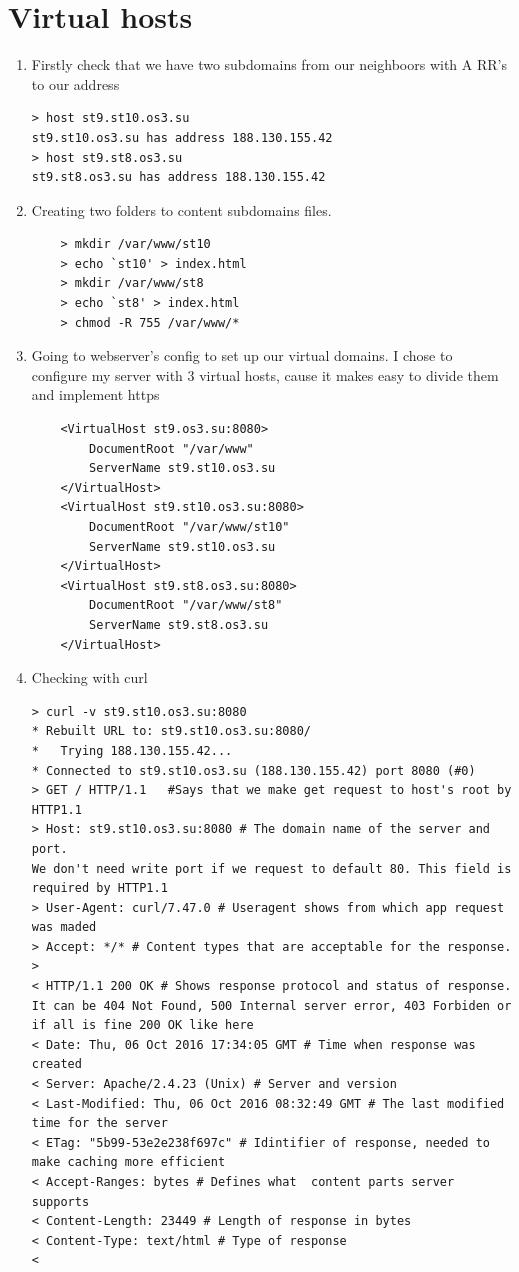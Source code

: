 \documentclass[10pt]{article}
\begin{document}
\section{Virtual hosts}
\begin{enumerate}
\item Firstly check that we have two subdomains from our neighboors with A RR's to our address
\begin{verbatim}
> host st9.st10.os3.su
st9.st10.os3.su has address 188.130.155.42
> host st9.st8.os3.su
st9.st8.os3.su has address 188.130.155.42
\end{verbatim}
\item Creating two folders to content subdomains files.
\begin{verbatim}
    > mkdir /var/www/st10
    > echo `st10' > index.html
    > mkdir /var/www/st8
    > echo `st8' > index.html
    > chmod -R 755 /var/www/*
\end{verbatim}
\item Going to webserver's config to set up our virtual domains. I chose to configure my server with 3 virtual hosts, cause it makes easy to divide them and implement https
\begin{verbatim}
    <VirtualHost st9.os3.su:8080>
        DocumentRoot "/var/www"
        ServerName st9.st10.os3.su
    </VirtualHost>
    <VirtualHost st9.st10.os3.su:8080>
        DocumentRoot "/var/www/st10"
        ServerName st9.st10.os3.su
    </VirtualHost>
    <VirtualHost st9.st8.os3.su:8080>
        DocumentRoot "/var/www/st8"
        ServerName st9.st8.os3.su
    </VirtualHost>
\end{verbatim}

\item Checking with curl
\begin{verbatim}
> curl -v st9.st10.os3.su:8080
* Rebuilt URL to: st9.st10.os3.su:8080/
*   Trying 188.130.155.42...
* Connected to st9.st10.os3.su (188.130.155.42) port 8080 (#0)
> GET / HTTP/1.1   #Says that we make get request to host's root by HTTP1.1 
> Host: st9.st10.os3.su:8080 # The domain name of the server and port. 
We don't need write port if we request to default 80. This field is required by HTTP1.1
> User-Agent: curl/7.47.0 # Useragent shows from which app request was maded
> Accept: */* # Content types that are acceptable for the response. 
>
< HTTP/1.1 200 OK # Shows response protocol and status of response. It can be 404 Not Found, 500 Internal server error, 403 Forbiden or if all is fine 200 OK like here
< Date: Thu, 06 Oct 2016 17:34:05 GMT # Time when response was created
< Server: Apache/2.4.23 (Unix) # Server and version
< Last-Modified: Thu, 06 Oct 2016 08:32:49 GMT # The last modified time for the server
< ETag: "5b99-53e2e238f697c" # Idintifier of response, needed to make caching more efficient
< Accept-Ranges: bytes # Defines what  content parts server supports
< Content-Length: 23449 # Length of response in bytes
< Content-Type: text/html # Type of response
<


\end{verbatim}
\end{enumerate}
\end{document}
